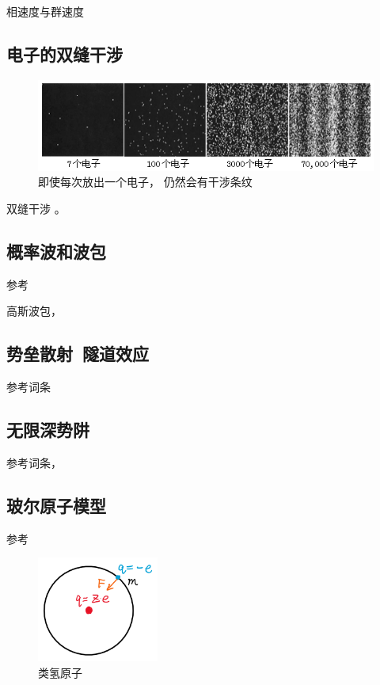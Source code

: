 相速度与群速度

\subsection{电子的双缝干涉}

\begin{figure}[ht]
\centering
\includegraphics[width=12cm]{./figures/QMIntr3.png}
\caption{即使每次放出一个电子， 仍然会有干涉条纹} \label{QMIntr_fig3}
\end{figure}

双缝干涉 。

\subsection{概率波和波包}
参考

高斯波包， 

\subsection{势垒散射\ 隧道效应}
参考词条

\subsection{无限深势阱}
参考词条， 

\subsection{玻尔原子模型}

参考

\begin{figure}[ht]
\centering
\includegraphics[width=4cm]{./figures/QMIntr1.png}
\caption{类氢原子} \label{QMIntr_fig1}
\end{figure}

